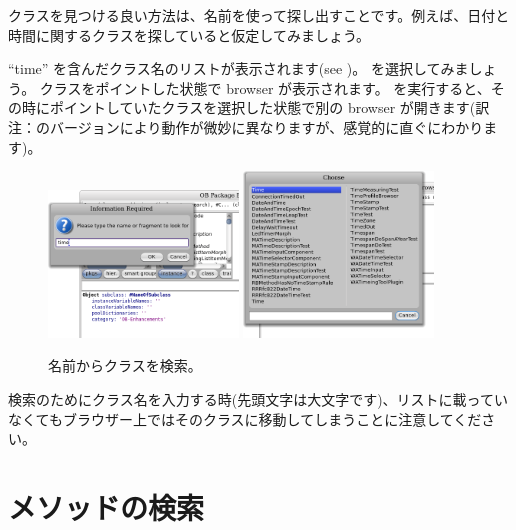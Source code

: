 \documentclass[a4paper,10pt,twoside]{book}
\begin{document}
{クラスを見つける良い方法は、名前を使って探し出すことです。例えば、日付と時間に関するクラスを探していると仮定してみましょう。

\noindent
``time'' を含んだクラス名のリストが表示されます(see )。 を選択してみましょう。 クラスをポイントした状態で browser が表示されます。 を実行すると、その時にポイントしていたクラスを選択した状態で別の browser が開きます(訳注：\pharo のバージョンにより動作が微妙に異なりますが、感覚的に直ぐにわかります)。

\begin{figure}[hbt]
\centerline{
	\includegraphics[width=0.45\textwidth]{FindIt}
	\hspace{1cm}
	\includegraphics[width=0.45\textwidth]{TimeClasses}
}
\caption{名前からクラスを検索。
}
\end{figure}

検索のためにクラス名を入力する時(先頭文字は大文字です)、リストに載っていなくてもブラウザー上ではそのクラスに移動してしまうことに注意してください。

\section{メソッドの検索}

}
\end{document}
